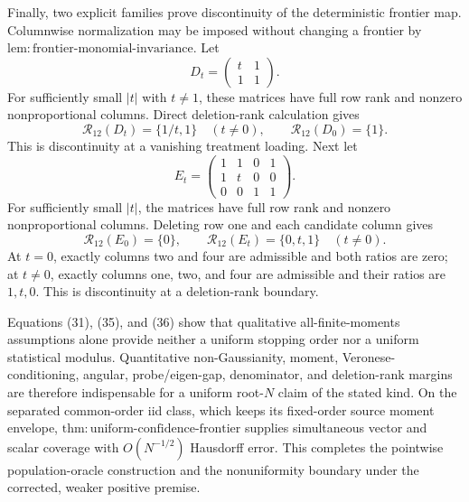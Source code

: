 Finally, two explicit families prove discontinuity of the deterministic frontier map. Columnwise normalization may be imposed without changing a frontier by \(\mathrm{lem:frontier\text{-}monomial\text{-}invariance}\). Let
\[
 D_t=\begin{pmatrix}t&1\\1&1\end{pmatrix}.
\]
For sufficiently small \(|t|\) with \(t\ne1\), these matrices have full row rank and nonzero nonproportional columns. Direct deletion-rank calculation gives
\[
 \mathcal R_{12}(D_t)=\{1/t,1\}\quad(t\ne0),
 \qquad
 \mathcal R_{12}(D_0)=\{1\}. \tag{35}
\]
This is discontinuity at a vanishing treatment loading. Next let
\[
 E_t=
 \begin{pmatrix}
 1&1&0&1\\
 1&t&0&0\\
 0&0&1&1
 \end{pmatrix}.
\]
For sufficiently small \(|t|\), the matrices have full row rank and nonzero nonproportional columns. Deleting row one and each candidate column gives
\[
 \mathcal R_{12}(E_0)=\{0\},
 \qquad
 \mathcal R_{12}(E_t)=\{0,t,1\}\quad(t\ne0). \tag{36}
\]
At \(t=0\), exactly columns two and four are admissible and both ratios are zero; at \(t\ne0\), exactly columns one, two, and four are admissible and their ratios are \(1,t,0\). This is discontinuity at a deletion-rank boundary.

Equations (31), (35), and (36) show that qualitative all-finite-moments assumptions alone provide neither a uniform stopping order nor a uniform statistical modulus. Quantitative non-Gaussianity, moment, Veronese-conditioning, angular, probe/eigen-gap, denominator, and deletion-rank margins are therefore indispensable for a uniform root-\(N\) claim of the stated kind. On the separated common-order iid class, which keeps its fixed-order source moment envelope, \(\mathrm{thm:uniform\text{-}confidence\text{-}frontier}\) supplies simultaneous vector and scalar coverage with \(O(N^{-1/2})\) Hausdorff error. This completes the pointwise population-oracle construction and the nonuniformity boundary under the corrected, weaker positive premise.